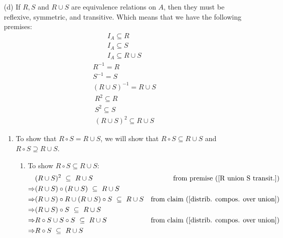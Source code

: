 \documentclass[fleqn]{article}
\begin{document}
\begin{enumerate}
\begin{enumerate}
		\item[(d)]
		If \(R, S\) and \(R \cup S\) are equivalence relations on \(A\), then they must be reflexive, symmetric, and transitive. Which means that we have the following premises:
		\begin{gather}
			I_A \subseteq R \label{R reflex.}\\
			I_A \subseteq S \label{S reflex.}\\
			I_A \subseteq R \cup S
		\end{gather}
		\begin{gather}
			R^{-1} = R \\
			S^{-1} = S \\
			(R \cup S)^{-1} = R \cup S
		\end{gather}
		\begin{gather}
			R^2 \subseteq R \\
			S^2 \subseteq S \\
			(R \cup S)^2 \subseteq R \cup S \label{R union S transit.}
		\end{gather}
		\begin{enumerate}
			\item %
			To show that \(R \circ S = R \cup S\), we will show that \(R \circ S \subseteq R \cup S\) and \(R \circ S \supseteq R \cup S\).
			\begin{enumerate}
				\item %
				To show \(R \circ S \subseteq R \cup S\):
				\begin{align*}
					&(R \cup S)^2 \ \subseteq \ R \cup S & \text{from premise (\ref{R union S transit.})} \\
					\Rightarrow & (R \cup S) \circ (R \cup S) \ \subseteq \ R \cup S \\
					\Rightarrow & (R \cup S) \circ R \cup (R \cup S) \circ S \ \subseteq \ R \cup S & \text{from claim (\ref{distrib. compos. over union})} \\
					\Rightarrow & (R \cup S) \circ S \ \subseteq \ R \cup S \\
					\Rightarrow & R \circ S \cup S \circ S \ \subseteq \ R \cup S &  \text{from claim (\ref{distrib. compos. over union})} \\
					\Rightarrow & R \circ S \ \subseteq \ R \cup S
				\end{align*}


\end{enumerate}
\end{enumerate}
\end{enumerate}
\end{enumerate}
\end{document}

